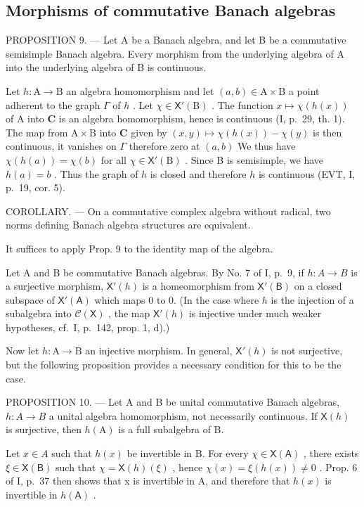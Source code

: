 \subsection{Morphisms of commutative Banach algebras}

PROPOSITION 9. --- Let A be a Banach algebra, and let B be a commutative semisimple Banach algebra. Every morphism from the underlying algebra of A into the underlying algebra of B is continuous.

Let \(h \colon \mathrm{A} \to \mathrm{B}\) an algebra homomorphism and let \((a, b) \in \mathrm{A} \times \mathrm{B}\) a point adherent to the graph \(\Gamma\) of \(h\) . Let \(\chi \in \mathsf{X}'(\mathrm{B})\) . The function \(x \mapsto \chi(h(x))\) of \(\mathrm{A}\) into \(\mathbf{C}\) is an algebra homomorphism, hence is continuous (I, p.~29, th. 1). The map from \(\mathrm{A} \times \mathrm{B}\) into \(\mathbf{C}\) given by \((x, y) \mapsto \chi(h(x)) - \chi(y)\) is then continuous, it vanishes on \(\Gamma\) therefore zero at \((a, b)\) We thus have \(\chi(h(a)) = \chi(b)\) for all \(\chi \in \mathsf{X}'(\mathrm{B})\) . Since B is semisimple, we have \(h(a) = b\) . Thus the graph of \(h\) is closed and therefore \(h\) is continuous (EVT, I, p.~19, cor. 5).

COROLLARY. --- On a commutative complex algebra without radical, two norms defining Banach algebra structures are equivalent.

It suffices to apply Prop. 9 to the identity map of the algebra.

Let A and B be commutative Banach algebras. By No. 7 of I, p.~9, if \(h\colon A\to B\) is a surjective morphism, \(\mathsf{X}'(h)\) is a homeomorphism from \(\mathsf{X}'(\mathsf{B})\) on a closed subspace of \(\mathsf{X}'(\mathsf{A})\) which maps 0 to 0. (In the case where \(h\) is the injection of a subalgebra into \(\mathcal{C}(\mathsf{X})\) , the map \(\mathsf{X}'(h)\) is injective under much weaker hypotheses, cf.~I, p.~142, prop. 1, d).)

Now let \(h \colon \mathrm{A} \to \mathrm{B}\) an injective morphism. In general, \(\mathsf{X}'(h)\) is not surjective, but the following proposition provides a necessary condition for this to be the case.

PROPOSITION 10. --- Let A and B be unital commutative Banach algebras, \(h\colon A\to B\) a unital algebra homomorphism, not necessarily continuous. If \(\mathsf{X}(h)\) is surjective, then \(h(\mathrm{A})\) is a full subalgebra of B.

Let \(x \in A\) such that \(h(x)\) be invertible in B. For every \(\chi \in \mathsf{X}(\mathsf{A})\) , there exists \(\xi \in \mathsf{X}(\mathsf{B})\) such that \(\chi = \mathsf{X}(h)(\xi)\) , hence \(\chi(x) = \xi(h(x)) \neq 0\) . Prop. 6 of I, p.~37 then shows that x is invertible in A, and therefore that \(h(x)\) is invertible in \(h(\mathsf{A})\) .

